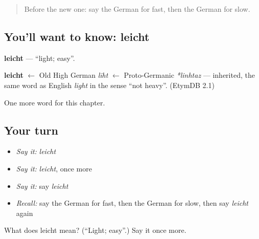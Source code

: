 \begin{quote}
Before the new one: say the German for fast, then the German for slow.
\end{quote}

\subsection*{You'll want to know: leicht}
\textbf{leicht} — \textquotedblleft{}light; easy\textquotedblright{}.

\begin{cousinweb}
\textbf{leicht} $\leftarrow$ Old High German \emph{līht} $\leftarrow$ Proto-Germanic \emph{*linhtaz} — inherited, the same word as English \emph{light} in the sense \textquotedblleft{}not heavy\textquotedblright{}. (EtymDB 2.1)
\end{cousinweb}

\begin{grammarlens}[title={What you've built}]
One more word for this chapter.
\end{grammarlens}

\subsection*{Your turn}
\begin{itemize}
\raggedright
  \item \emph{Say it:} \emph{leicht}
  \item \emph{Say it:} \emph{leicht}, once more
  \item \emph{Say it:} say \emph{leicht}
  \item \emph{Recall:} say the German for fast, then the German for slow, then say \emph{leicht} again
\end{itemize}

\begin{tcolorbox}[breakable,colback=teal!4,colframe=teal!35!black,title={Before you move on}]
What does leicht mean? (\textquotedblleft{}Light; easy\textquotedblright{}.) Say it once more.
\end{tcolorbox}
